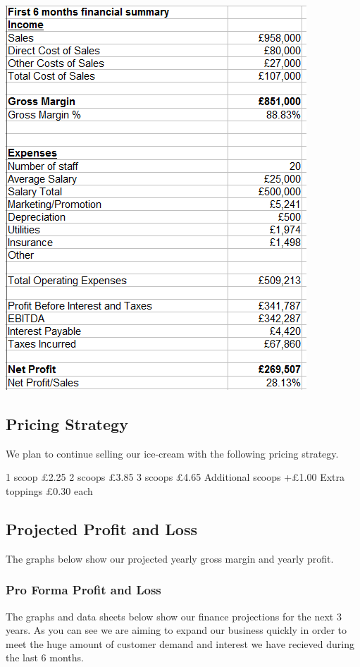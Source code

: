 \documentclass{article}
\begin{document}
\includegraphics[scale=1.0]{firstSixMonths.png}

\subsection{Pricing Strategy}

We plan to continue selling our ice-cream with the following pricing strategy.

1 scoop £2.25
2 scoops £3.85
3 scoops £4.65
Additional scoops +£1.00
Extra toppings £0.30 each

\subsection{Projected Profit and Loss}

The graphs below show our projected yearly gross margin and yearly profit.

\subsubsection{Pro Forma Profit and Loss}

The graphs and data sheets below show our finance projections for the next 3 years. As you can see we are aiming to expand our business quickly in order to meet the huge amount of customer demand and interest we have recieved during the last 6 months.
\end{document}
